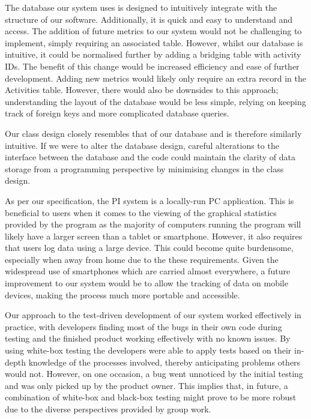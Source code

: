 \documentclass[11pt]{article}
\begin{document}
The database our system uses is designed to intuitively integrate with the 
structure of our software. Additionally, it is quick and easy to understand and access. The 
addition of future metrics to our system would not be challenging to implement, 
simply requiring an associated table. However, whilst our database is intuitive, 
it could be normalised further by adding a bridging table with 
activity IDs. The benefit of this change would be increased efficiency and 
ease of further development. Adding new metrics would likely only require an 
extra record in the Activities table. However, there would also be downsides 
to this approach; understanding the layout of the database would be less 
simple, relying on keeping track of foreign keys and more complicated database 
queries. \par

Our class design closely resembles that of our database and is therefore
similarly intuitive. If we were to alter the database design, careful
alterations to the interface between the database and the code could maintain
the clarity of data storage from a programming perspective by minimising
changes in the class design.\par

As per our specification, the PI system is a locally-run PC application. This 
is beneficial to users when it comes to the viewing of the graphical statistics 
provided by the program as the majority of computers running the program will 
likely have a larger screen than a tablet or smartphone. However, it also 
requires that users log data using a large device. This could become quite 
burdensome, especially when away from home due to the these requirements. 
Given the widespread use of smartphones which are 
carried almost everywhere, a future improvement to our system would be 
to allow the tracking of data on mobile devices, making the process much more 
portable and accessible.\par

\newpage

Our approach to the test-driven development of our system worked effectively in 
practice, with developers finding most of the bugs in their own code during 
testing and the finished product working effectively with no known issues. By 
using white-box testing the developers were able to apply tests based on their 
in-depth knowledge of the processes involved, thereby anticipating problems 
others would not. However, on one occasion, a bug went unnoticed by the initial 
testing and was only picked up by the product owner. This implies that, in 
future, a combination of white-box and black-box testing might prove to be more 
robust due to the diverse perspectives provided by group work.\par  
\end{document}
